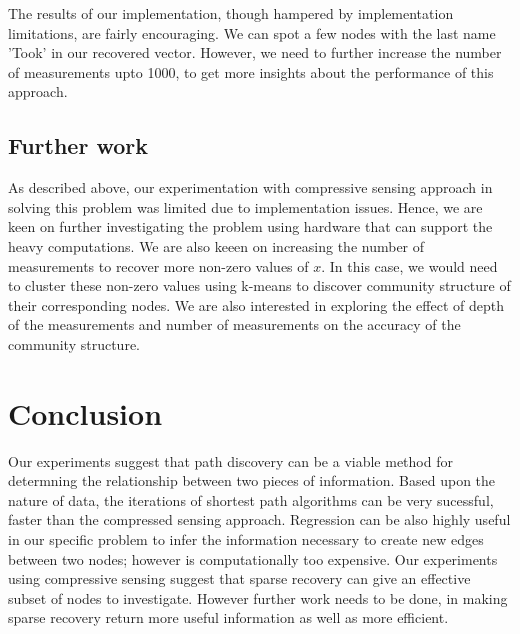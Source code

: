 \documentclass{article} %
\begin{document}
The results of our implementation, though hampered by implementation limitations, are fairly encouraging. We can spot a few nodes with the last name 'Took' in our recovered vector. However, we need to further increase the number of measurements upto 1000, to get more insights about the performance of this approach.

\subsection{Further work}

As described above, our experimentation with compressive sensing approach in solving this problem was limited due to implementation issues. Hence, we are keen on further investigating the problem using hardware that can support the heavy computations. We are also keeen on increasing the number of measurements to recover more non-zero values of $x$. In this case, we would need to cluster these non-zero values using k-means to discover community structure of their corresponding nodes. We are also interested in exploring the effect of depth of the measurements and number of measurements on the accuracy of the community structure. 


\section{Conclusion}
Our experiments suggest that path discovery can be a viable method for determning the relationship between two pieces of information. Based upon the nature of data, the iterations of shortest path algorithms can be very sucessful, faster than the compressed sensing approach. Regression can be also highly useful in our specific problem to infer the information necessary to create new edges between two nodes; however is computationally too expensive. Our experiments using compressive sensing suggest that sparse recovery can give an effective subset of nodes to investigate. However further work needs to be done, in making sparse recovery return more useful information as well as more efficient.
\end{document}
